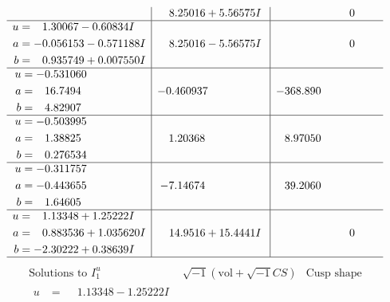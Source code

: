 \documentclass[1p]{elsarticle_modified}
\theoremstyle{definition}
\newcommand{\I}{\sqrt{-1}}
\begin{document}
$$\begin{array}{c|c|c}
 & \phantom{-}8.25016 + 5.56575 I & \phantom{-0.000000 } 0 \\ \hline\begin{aligned}
u &= \phantom{-}1.30067 - 0.60834 I \\
a &= -0.056153 - 0.571188 I \\
b &= \phantom{-}0.935749 + 0.007550 I\end{aligned}
 & \phantom{-}8.25016 - 5.56575 I & \phantom{-0.000000 } 0 \\ \hline\begin{aligned}
u &= -0.531060\phantom{ +0.000000I} \\
a &= \phantom{-}16.7494\phantom{ +0.000000I} \\
b &= \phantom{-}4.82907\phantom{ +0.000000I}\end{aligned}
 & -0.460937\phantom{ +0.000000I} & -368.890\phantom{ +0.000000I} \\ \hline\begin{aligned}
u &= -0.503995\phantom{ +0.000000I} \\
a &= \phantom{-}1.38825\phantom{ +0.000000I} \\
b &= \phantom{-}0.276534\phantom{ +0.000000I}\end{aligned}
 & \phantom{-}1.20368\phantom{ +0.000000I} & \phantom{-}8.97050\phantom{ +0.000000I} \\ \hline\begin{aligned}
u &= -0.311757\phantom{ +0.000000I} \\
a &= -0.443655\phantom{ +0.000000I} \\
b &= \phantom{-}1.64605\phantom{ +0.000000I}\end{aligned}
 & -7.14674\phantom{ +0.000000I} & \phantom{-}39.2060\phantom{ +0.000000I} \\ \hline\begin{aligned}
u &= \phantom{-}1.13348 + 1.25222 I \\
a &= \phantom{-}0.883536 + 1.035620 I \\
b &= -2.30222 + 0.38639 I\end{aligned}
 & \phantom{-}14.9516 + 15.4441 I & \phantom{-0.000000 } 0\\
 \hline 
 \end{array}$$\newpage$$\begin{array}{c|c|c}  
\text{Solutions to }I^u_{1}& \I (\text{vol} + \sqrt{-1}CS) & \text{Cusp shape}\\
 \hline 
\begin{aligned}
u &= \phantom{-}1.13348 - 1.25222 I \\

\end{aligned}
\end{array}$$
\end{document}
